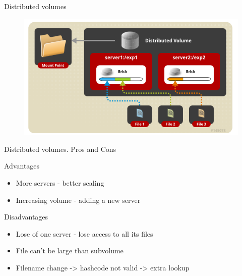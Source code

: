 \documentclass{beamer}
\begin{document}
\begin{frame}{Distributed volumes}
	\begin{figure}[h]
		\centering
		\includegraphics[width=0.8\linewidth]{distributed.png}
	\end{figure}

\end{frame}

\begin{frame}{Distributed volumes. Pros and Cons}
	\begin{block}{Advantages}
		\begin{itemize}
			\item More servers - better scaling
			\item Increasing volume - adding a new server %
		\end{itemize}
	\end{block}
	\begin{block}{Disadvantages}
		\begin{itemize}
			\item Lose of one server - lose access to all its files
			\item File can't be large than subvolume
			\item Filename change -> hashcode not valid -> extra lookup
		\end{itemize}
	\end{block}
\end{frame}
\end{document}
